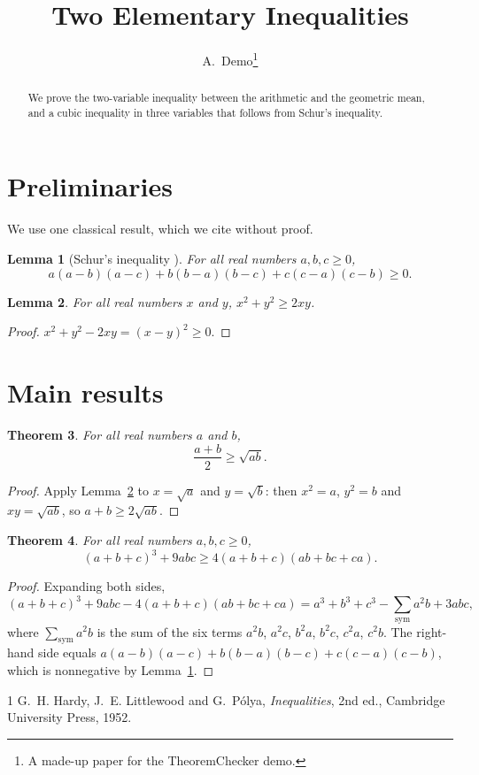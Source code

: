 \documentclass{article}
\title{Two Elementary Inequalities}
\author{A.~Demo\thanks{A made-up paper for the TheoremChecker demo.}}
\date{}
\newtheorem{theorem}{Theorem}
\newtheorem{lemma}[theorem]{Lemma}
\begin{document}
\maketitle

\begin{abstract}
We prove the two-variable inequality between the arithmetic and the geometric mean, and a cubic
inequality in three variables that follows from Schur's inequality.
\end{abstract}

\section{Preliminaries}

We use one classical result, which we cite without proof.

\begin{lemma}[Schur's inequality {\cite[Theorem~1]{hlp}}]\label{lem:schur}
For all real numbers $a, b, c \ge 0$,
\[
  a(a-b)(a-c) + b(b-a)(b-c) + c(c-a)(c-b) \ge 0 .
\]
\end{lemma}

\begin{lemma}\label{lem:sq}
For all real numbers $x$ and $y$, $x^2 + y^2 \ge 2xy$.
\end{lemma}

\begin{proof}
$x^2 + y^2 - 2xy = (x - y)^2 \ge 0$.
\end{proof}

\section{Main results}

\begin{theorem}\label{thm:amgm}
For all real numbers $a$ and $b$,
\[
  \frac{a + b}{2} \ge \sqrt{ab} .
\]
\end{theorem}

\begin{proof}
Apply Lemma~\ref{lem:sq} to $x = \sqrt{a}$ and $y = \sqrt{b}$: then $x^2 = a$, $y^2 = b$ and
$xy = \sqrt{ab}$, so $a + b \ge 2\sqrt{ab}$.
\end{proof}

\begin{theorem}\label{thm:cubic}
For all real numbers $a, b, c \ge 0$,
\[
  (a + b + c)^3 + 9abc \ge 4(a + b + c)(ab + bc + ca) .
\]
\end{theorem}

\begin{proof}
Expanding both sides,
\[
  (a+b+c)^3 + 9abc - 4(a+b+c)(ab+bc+ca)
  = a^3 + b^3 + c^3 - \sum_{\mathrm{sym}} a^2 b + 3abc ,
\]
where $\sum_{\mathrm{sym}} a^2 b$ is the sum of the six terms $a^2 b$, $a^2 c$, $b^2 a$, $b^2 c$,
$c^2 a$, $c^2 b$. The right-hand side equals
$a(a-b)(a-c) + b(b-a)(b-c) + c(c-a)(c-b)$, which is nonnegative by Lemma~\ref{lem:schur}.
\end{proof}

\begin{thebibliography}{1}
 G.~H. Hardy, J.~E. Littlewood and G.~P\'olya, \emph{Inequalities}, 2nd ed.,
Cambridge University Press, 1952.
\end{thebibliography}
\end{document}
